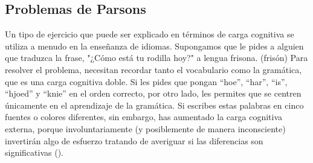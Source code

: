 
\subsection*{Problemas de Parsons} 
Un tipo de ejercicio que puede ser explicado en términos de carga cognitiva se utiliza a menudo en la enseñanza de idiomas.
Supongamos que le pides a alguien que traduzca la frase, "¿Cómo está tu rodilla hoy?" a lengua frisona. (frisón)
Para resolver el problema, necesitan recordar tanto el vocabulario como la gramática, que es una carga cognitiva doble.
Si les pides que pongan ``hoe'', ``har'', ``is'', ``hjoed'' y ``knie'' en el orden correcto, por otro lado, les permites que se centren únicamente en el aprendizaje de la gramática.
Si escribes estas palabras en cinco fuentes o colores diferentes, sin embargo, has aumentado la carga cognitiva externa, porque involuntariamente (y posiblemente de manera inconsciente) invertirán algo de esfuerzo tratando de averiguar si las diferencias son significativas ().

